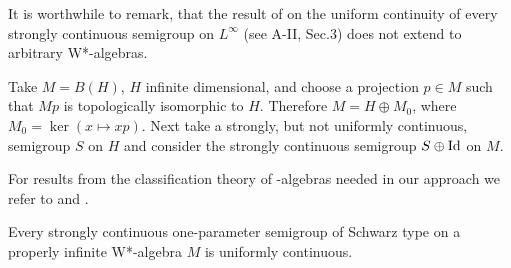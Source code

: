 It is worthwhile to remark, that the result of  \citet{lotz:1985} on the uniform continuity of every strongly continuous semigroup on $L^\infty$ (see A-II, Sec.3) does not extend to arbitrary W*-algebras.
\begin{example}
Take $M = B(H)$, $H$ infinite dimensional, and choose a projection $p \in M$ such that $Mp$ is topologically isomorphic to $H$.
Therefore $M = H \oplus M_{0}$, where $M_{0} = \ker(x \mapsto xp)$.
Next take a strongly, but not uniformly continuous, semigroup $S$ on $H$ and consider the strongly continuous semigroup $S \oplus \operatorname{Id}$ on $M$.
\end{example}
For results from the classification theory of \WA-algebras needed in our approach we refer to \citet[2.2]{sakai:1971} and \citet[V.1]{takesaki:1979}.
\begin{theorem}\label{thm:schwarz_uniform}
Every strongly continuous one-parameter semigroup of Schwarz type on a properly infinite W*-algebra $M$ is uniformly continuous.
\end{theorem}
